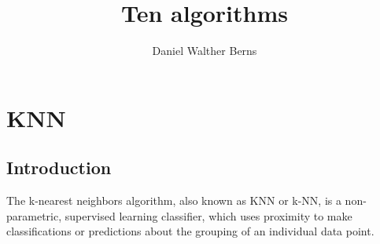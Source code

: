 \documentclass[10pt,a4paper]{book}
\author{Daniel Walther Berns}
\title{Ten algorithms}
\begin{document}
	\maketitle
	\chapter{KNN}
    

    \section{Introduction}
    The k-nearest neighbors algorithm, also known as KNN or k-NN, is a non-parametric, supervised learning classifier, which uses proximity to make classifications or predictions about the grouping of an individual data point. 
    
\end{document}
